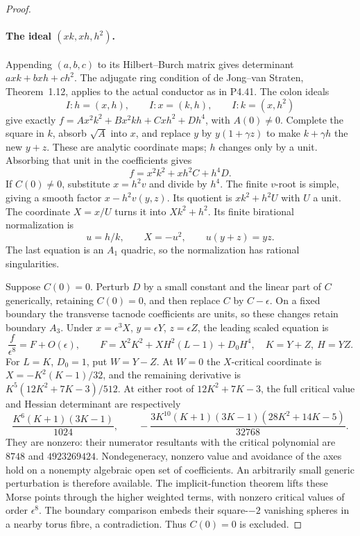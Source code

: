\begin{proof}
\paragraph{The ideal $(xk,xh,h^2)$.}
Appending $(a,b,c)$ to its Hilbert--Burch matrix gives
determinant $axk+bxh+ch^2$. The adjugate ring condition
of de Jong--van Straten, Theorem~1.12, applies to the
actual conductor as in P4.41. The colon ideals
\[
 I:h=(x,h),\qquad I:x=(k,h),\qquad I:k=(x,h^2)
\]
give exactly
$f=A x^2k^2+B x^2kh+Cxh^2+Dh^4$, with $A(0)\ne0$.
Complete the square in $k$, absorb $\sqrt A$ into $x$,
and replace $y$ by $y(1+\gamma z)$ to make
$k+\gamma h$ the new $y+z$. These are analytic
coordinate maps; $h$ changes only by a unit.
Absorbing that unit in the coefficients gives
\[
                       f=x^2k^2+xh^2C+h^4D.          \tag{4.49a}
\]
If $C(0)\ne0$, substitute $x=h^2v$ and divide by
$h^4$. The finite $v$-root is simple, giving a smooth
factor $x-h^2v(y,z)$. Its quotient is $xk^2+h^2U$
with $U$ a unit. The coordinate $X=x/U$ turns it
into $Xk^2+h^2$. Its finite birational normalization is
\[
                 u=h/k,\qquad X=-u^2,
                 \qquad u(y+z)=yz.
\]
The last equation is an $A_1$ quadric, so the
normalization has rational singularities.

Suppose $C(0)=0$. Perturb $D$ by a small constant
and the linear part of $C$ generically, retaining
$C(0)=0$, and then replace $C$ by $C-\epsilon$.
On a fixed boundary the transverse tacnode coefficients
are units, so these changes retain boundary $A_3$.
Under $x=\epsilon^3X$, $y=\epsilon Y$,
$z=\epsilon Z$, the leading scaled equation is
\[
 \frac f{\epsilon^8}=F+O(\epsilon),\qquad
 F=X^2K^2+XH^2(L-1)+D_0H^4,
 \quad K=Y+Z,\ H=YZ.
\]
For $L=K$, $D_0=1$, put $W=Y-Z$.
At $W=0$ the $X$-critical coordinate is
$X=-K^2(K-1)/32$, and the remaining derivative is
$K^5(12K^2+7K-3)/512$.
At either root of $12K^2+7K-3$, the full critical
value and Hessian determinant are respectively
\[
 \frac{K^6(K+1)(3K-1)}{1024},\qquad
 -\frac{3K^{10}(K+1)(3K-1)(28K^2+14K-5)}{32768}.
\]
They are nonzero: their numerator resultants with the
critical polynomial are $8748$ and $4923269424$.
Nondegeneracy, nonzero value and avoidance of the axes
hold on a nonempty algebraic open set of coefficients.
An arbitrarily small generic perturbation is therefore
available. The implicit-function theorem lifts these
Morse points through the higher weighted terms, with
nonzero critical values of order $\epsilon^8$.
The boundary comparison embeds their square-$-2$
vanishing spheres in a nearby torus fibre, a
contradiction. Thus $C(0)=0$ is excluded.


\end{proof}
